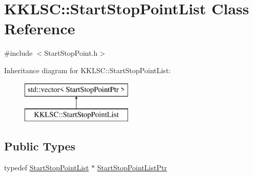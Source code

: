 \hypertarget{class_k_k_l_s_c_1_1_start_stop_point_list}{}\section{K\+K\+L\+SC\+:\+:Start\+Stop\+Point\+List Class Reference}
\label{class_k_k_l_s_c_1_1_start_stop_point_list}


{\ttfamily \#include $<$Start\+Stop\+Point.\+h$>$}

Inheritance diagram for K\+K\+L\+SC\+:\+:Start\+Stop\+Point\+List\+:\begin{figure}[H]
\begin{center}
\leavevmode
\includegraphics[height=2.000000cm]{class_k_k_l_s_c_1_1_start_stop_point_list}
\end{center}
\end{figure}
\subsection*{Public Types}
\begin{DoxyCompactItemize}
\item 
typedef \hyperlink{class_k_k_l_s_c_1_1_start_stop_point_list}{Start\+Stop\+Point\+List} $\ast$ \hyperlink{class_k_k_l_s_c_1_1_start_stop_point_list_ab1a48b5aec1d7b9ee8435b9f2f2ebf08}{Start\+Stop\+Point\+List\+Ptr}
\end{DoxyCompactItemize}
